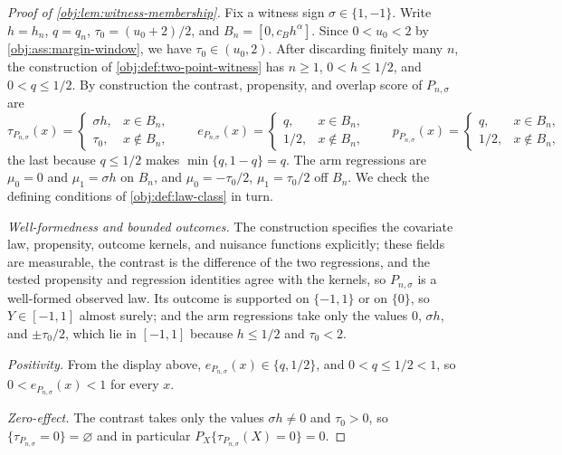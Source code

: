 \begin{proof}[Proof of \cref{obj:lem:witness-membership}]
Fix a witness sign \(\sigma\in\{1,-1\}\).  Write \(h=h_n\), \(q=q_n\), \(\tau_0=(u_0+2)/2\), and \(B_n=[0,c_Bh^\alpha]\).  Since \(0<u_0<2\) by \cref{obj:ass:margin-window}, we have \(\tau_0\in(u_0,2)\).  After discarding finitely many \(n\), the construction of \cref{obj:def:two-point-witness} has \(n\ge1\), \(0<h\le1/2\), and \(0<q\le1/2\). %
By construction the contrast, propensity, and overlap score of \(P_{n,\sigma}\) are
\[
\tau_{P_{n,\sigma}}(x)=
\begin{cases}\sigma h,&x\in B_n,\\ \tau_0,&x\notin B_n,\end{cases}
\qquad
e_{P_{n,\sigma}}(x)=
\begin{cases}q,&x\in B_n,\\ 1/2,&x\notin B_n,\end{cases}
\qquad
p_{P_{n,\sigma}}(x)=
\begin{cases}q,&x\in B_n,\\ 1/2,&x\notin B_n,\end{cases}
\]
the last because \(q\le1/2\) makes \(\min\{q,1-q\}=q\).  The arm regressions are \(\mu_0=0\) and \(\mu_1=\sigma h\) on \(B_n\), and \(\mu_0=-\tau_0/2\), \(\mu_1=\tau_0/2\) off \(B_n\).  We check the defining conditions of \cref{obj:def:law-class} in turn.

\emph{Well-formedness and bounded outcomes.}  The construction specifies the covariate law, propensity, outcome kernels, and nuisance functions explicitly; these fields are measurable, the contrast is the difference of the two regressions, and the tested propensity and regression identities agree with the kernels, so \(P_{n,\sigma}\) is a well-formed observed law. %
Its outcome is supported on \(\{-1,1\}\) or on \(\{0\}\), so \(Y\in[-1,1]\) almost surely; and the arm regressions take only the values \(0\), \(\sigma h\), and \(\pm\tau_0/2\), which lie in \([-1,1]\) because \(h\le1/2\) and \(\tau_0<2\). %

\emph{Positivity.}  From the display above, \(e_{P_{n,\sigma}}(x)\in\{q,1/2\}\), and \(0<q\le1/2<1\), so \(0<e_{P_{n,\sigma}}(x)<1\) for every \(x\). %

\emph{Zero-effect.}  The contrast takes only the values \(\sigma h\ne0\) and \(\tau_0>0\), so \(\{\tau_{P_{n,\sigma}}=0\}=\varnothing\) and in particular \(P_X\{\tau_{P_{n,\sigma}}(X)=0\}=0\). %


\end{proof}
